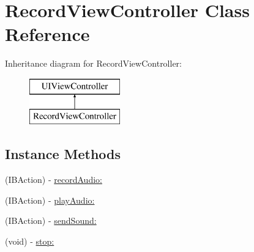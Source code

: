 \hypertarget{interface_record_view_controller}{\section{Record\-View\-Controller Class Reference}
\label{interface_record_view_controller}
}
Inheritance diagram for Record\-View\-Controller\-:\begin{figure}[H]
\begin{center}
\leavevmode
\includegraphics[height=2.000000cm]{interface_record_view_controller}
\end{center}
\end{figure}
\subsection*{Instance Methods}
\begin{DoxyCompactItemize}
\item 
(I\-B\-Action) -\/ \hyperlink{interface_record_view_controller_a744c609891c7b5dad7987a1bf8b848ff}{record\-Audio\-:}
\item 
(I\-B\-Action) -\/ \hyperlink{interface_record_view_controller_ab605dd19c869740a7acbf3ccb8420d40}{play\-Audio\-:}
\item 
(I\-B\-Action) -\/ \hyperlink{interface_record_view_controller_a5df281f625ec7eb0a5137f262d3f60c5}{send\-Sound\-:}
\item 
(void) -\/ \hyperlink{interface_record_view_controller_ad04059a6b5d8eaacee8db7f7cad907d3}{stop\-:}
\end{DoxyCompactItemize}

